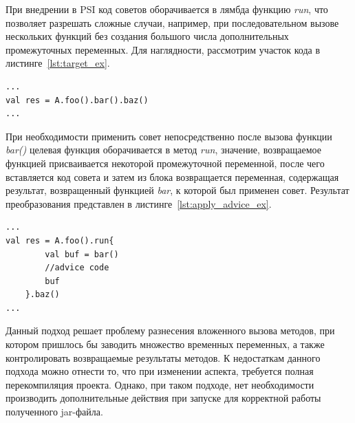 \documentclass[conference]{IEEEtran}
\begin{document}
При внедрении в PSI код советов оборачивается в лямбда функцию \textit{run}, что
позволяет разрешать сложные случаи, например, при последовательном вызове
нескольких функций без создания большого числа дополнительных 
промежуточных переменных.
Для наглядности, рассмотрим участок кода в листинге~\ref{lst:target_ex}.
\begin{lstlisting}[label=lst:target_ex,
    caption={Пример целевой точки внедрения}]
...
val res = A.foo().bar().baz()
...
\end{lstlisting}
При необходимости применить совет непосредственно после вызова функции 
\textit{bar()} целевая функция оборачивается в метод \textit{run}, значение, 
возвращаемое функцией присваивается некоторой промежуточной переменной, после 
чего вставляется код совета и затем из блока возвращается переменная, 
содержащая результат, возвращенный функцией \textit{bar}, к которой был применен
совет.
Результат преобразования представлен в листинге~\ref{lst:apply_advice_ex}.
\begin{lstlisting}[label=lst:apply_advice_ex,
    caption={Пример внедрения кода с использованием функции run}]
...
val res = A.foo().run{
        val buf = bar()
        //advice code
        buf
    }.baz()
...
\end{lstlisting}

Данный подход решает проблему разнесения вложенного вызова методов, при котором 
пришлось бы заводить множество временных переменных, а также контролировать 
возвращаемые результаты методов.
К недостаткам данного подхода можно отнести то, что при изменении аспекта,
требуется полная перекомпиляция проекта.
Однако, при таком подходе, нет необходимости производить дополнительные действия
при запуске для корректной работы полученного jar-файла.

\end{document}
